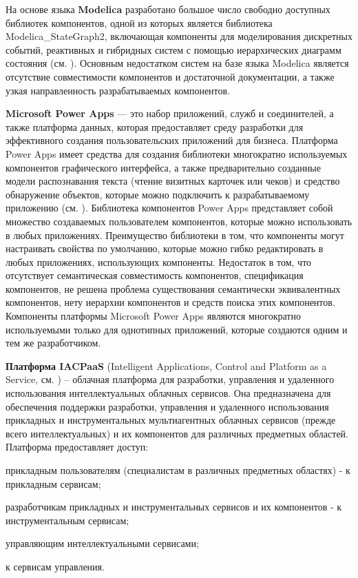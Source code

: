 На основе языка \textbf{Modelica} разработано большое число свободно доступных библиотек компонентов, одной из которых является библиотека Modelica\_StateGraph2, включающая компоненты для моделирования дискретных событий, реактивных и гибридных систем с помощью иерархических диаграмм состояния (см. ). Основным недостатком систем на базе языка Modelica является отсутствие совместимости компонентов и достаточной документации, а также узкая направленность разрабатываемых компонентов.

\textbf{Microsoft Power Apps} — это набор приложений, служб и соединителей, а также платформа данных, которая предоставляет среду разработки для эффективного создания пользовательских приложений для бизнеса. Платформа Power Apps имеет средства для создания библиотеки многократно используемых компонентов графического интерфейса, а также предварительно созданные модели распознавания текста (чтение визитных карточек или чеков) и средство обнаружение объектов, которые можно подключить к разрабатываемому приложению (см. ). Библиотека компонентов Power Apps представляет собой множество создаваемых пользователем компонентов, которые можно использовать в любых приложениях. Преимущество библиотеки в том, что компоненты могут настраивать свойства по умолчанию, которые можно гибко редактировать в любых приложениях, использующих компоненты. Недостаток в том, что отсутствует семантическая совместимость компонентов, спецификация компонентов, не решена проблема существования семантически эквивалентных компонентов, нету иерархии компонентов и средств поиска этих компонентов. Компоненты платформы Microsoft Power Apps являются многократно используемыми только для однотипных приложений, которые создаются одним и тем же разработчиком.

\textbf{Платформа IACPaaS} (Intelligent Applications, Control and Platform as a Service, см. ) – облачная платформа для разработки, управления и удаленного использования интеллектуальных облачных сервисов. Она предназначена для обеспечения поддержки разработки, управления и удаленного использования прикладных и инструментальных мультиагентных облачных сервисов (прежде всего интеллектуальных) и их компонентов для различных предметных областей. Платформа предоставляет доступ:
\begin{textitemize}
	\item прикладным пользователям (специалистам в различных предметных областях) - к прикладным сервисам;
	\item разработчикам прикладных и инструментальных сервисов и их компонентов - к инструментальным сервисам;
	\item управляющим интеллектуальными сервисами;
	\item к сервисам управления.
\end{textitemize}

